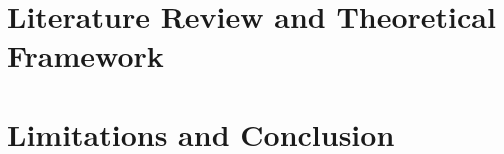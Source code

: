 \documentclass[11pt]{article}
\begin{document}
\section{Literature Review and Theoretical Framework}
\label{sec:lit_review}


\section{Limitations and Conclusion}
\label{sec:discussion}



\printbibliography
\end{document}
